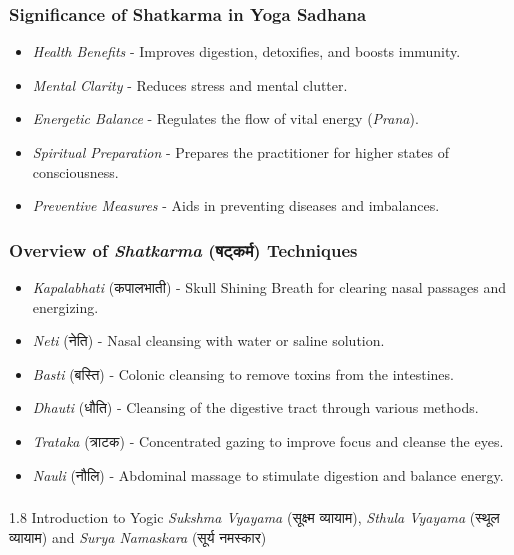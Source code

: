 \begin{frame}[fragile]\frametitle{Significance of Shatkarma in Yoga Sadhana}

      \begin{itemize}
		\item \textit{Health Benefits} - Improves digestion, detoxifies, and boosts immunity.
		\item \textit{Mental Clarity} - Reduces stress and mental clutter.
		\item \textit{Energetic Balance} - Regulates the flow of vital energy (\textit{Prana}).
		\item \textit{Spiritual Preparation} - Prepares the practitioner for higher states of consciousness.
		\item \textit{Preventive Measures} - Aids in preventing diseases and imbalances.
	  \end{itemize}

\end{frame}

\begin{frame}[fragile]\frametitle{Overview of \textit{Shatkarma} (षट्कर्म) Techniques}

      \begin{itemize}
        \item \textit{Kapalabhati} (कपालभाती) - Skull Shining Breath for clearing nasal passages and energizing.
        \item \textit{Neti} (नेति) - Nasal cleansing with water or saline solution.
        \item \textit{Basti} (बस्ति) - Colonic cleansing to remove toxins from the intestines.
        \item \textit{Dhauti} (धौति) - Cleansing of the digestive tract through various methods.
        \item \textit{Trataka} (त्राटक) - Concentrated gazing to improve focus and cleanse the eyes.
        \item \textit{Nauli} (नौलि) - Abdominal massage to stimulate digestion and balance energy.
      \end{itemize}

\end{frame}


\begin{frame}[fragile]\frametitle{}
\begin{center}
{\Large 1.8 Introduction to Yogic \textit{Sukshma Vyayama} (सूक्ष्म व्यायाम), \textit{Sthula Vyayama} (स्थूल व्यायाम) and \textit{Surya Namaskara} (सूर्य नमस्कार)}
\end{center}
\end{frame}


